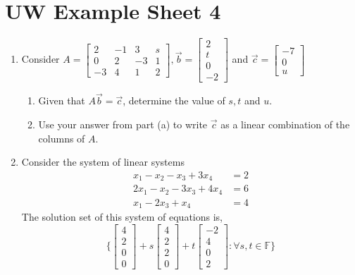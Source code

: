 \documentclass{report}
\newcommand{\F}{{\mathbb{F}}}
\begin{document}
\chapter*{UW Example Sheet 4}
\begin{enumerate}
    \item Consider $A = \begin{bmatrix}
    2 & -1 & 3 & s\\
    0 & 2 & -3 & 1\\
    -3 & 4 & 1 & 2
    \end{bmatrix}, \vec{b} = \begin{bmatrix}
    2\\t\\0\\-2
    \end{bmatrix}$ and $\vec{c} =
    \begin{bmatrix}
    -7\\0\\u
    \end{bmatrix}$
    \begin{enumerate}
        \item Given that $A\vec{b} = \vec{c}$, determine the value of $s, t$ and $u$.
        \item Use your answer from part (a) to write $\vec{c}$ as a linear combination of the columns of $A$.
    \end{enumerate}
    \item Consider the system of linear systems
    \begin{align*}
        x_1 - x_2 - x_3 + 3x_4 &= 2\\
        2x_1 - x_2 - 3x_3 + 4x_4 &= 6\\
        x_1 - 2x_3 + x_4 &= 4
    \end{align*}
    The solution set of this system of equations is, 
    $$\Bigg\{\begin{bmatrix} 4\\2\\0\\0 \end{bmatrix} + s\begin{bmatrix} 4\\2\\2\\0 \end{bmatrix} + t\begin{bmatrix} -2\\4\\0\\2 \end{bmatrix}: \forall s, t \in \F \Bigg\}$$

\end{enumerate}
\end{document}
